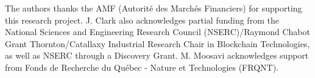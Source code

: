 \begin{acks} 
The authors thanks the AMF (Autorité des Marchés Financiers) for supporting this research project. J. Clark also acknowledges partial funding from the National Sciences and Engineering Research Council (NSERC)/Raymond Chabot Grant Thornton/Catallaxy Industrial Research Chair in Blockchain Technologies, as well as NSERC through a Discovery Grant. M. Moosavi acknowledges support from Fonds de Recherche du Québec - Nature et Technologies (FRQNT).
\end{acks}


























